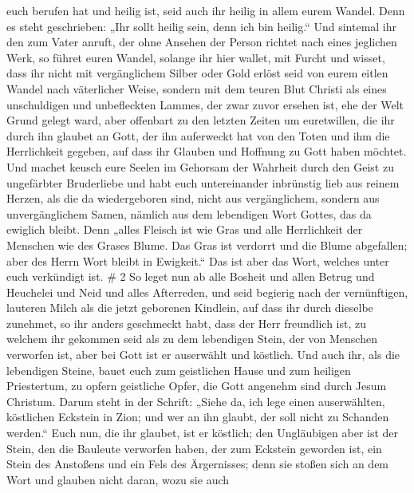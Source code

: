 euch berufen hat und heilig ist, seid auch ihr heilig in allem eurem
Wandel.  Denn es steht geschrieben: „Ihr sollt heilig sein,
denn ich bin heilig.``  Und sintemal ihr den zum Vater
anruft, der ohne Ansehen der Person richtet nach eines jeglichen Werk,
so führet euren Wandel, solange ihr hier wallet, mit Furcht
 und wisset, dass ihr nicht mit vergänglichem Silber oder
Gold erlöst seid von eurem eitlen Wandel nach väterlicher Weise,
 sondern mit dem teuren Blut Christi als eines unschuldigen
und unbefleckten Lammes,  der zwar zuvor ersehen ist, ehe
der Welt Grund gelegt ward, aber offenbart zu den letzten Zeiten um
euretwillen,  die ihr durch ihn glaubet an Gott, der ihn
auferweckt hat von den Toten und ihm die Herrlichkeit gegeben, auf dass
ihr Glauben und Hoffnung zu Gott haben möchtet.  Und machet
keusch eure Seelen im Gehorsam der Wahrheit durch den Geist zu
ungefärbter Bruderliebe und habt euch untereinander inbrünstig lieb aus
reinem Herzen,  als die da wiedergeboren sind, nicht aus
vergänglichem, sondern aus unvergänglichem Samen, nämlich aus dem
lebendigen Wort Gottes, das da ewiglich bleibt.  Denn
„alles Fleisch ist wie Gras und alle Herrlichkeit der Menschen wie des
Grases Blume. Das Gras ist verdorrt und die Blume abgefallen;
 aber des Herrn Wort bleibt in Ewigkeit.`` Das ist aber das
Wort, welches unter euch verkündigt ist. \# 2  So leget nun
ab alle Bosheit und allen Betrug und Heuchelei und Neid und alles
Afterreden,  und seid begierig nach der vernünftigen,
lauteren Milch als die jetzt geborenen Kindlein, auf dass ihr durch
dieselbe zunehmet,  so ihr anders geschmeckt habt, dass der
Herr freundlich ist,  zu welchem ihr gekommen seid als zu
dem lebendigen Stein, der von Menschen verworfen ist, aber bei Gott ist
er auserwählt und köstlich.  Und auch ihr, als die
lebendigen Steine, bauet euch zum geistlichen Hause und zum heiligen
Priestertum, zu opfern geistliche Opfer, die Gott angenehm sind durch
Jesum Christum.  Darum steht in der Schrift: „Siehe da, ich
lege einen auserwählten, köstlichen Eckstein in Zion; und wer an ihn
glaubt, der soll nicht zu Schanden werden.``  Euch nun, die
ihr glaubet, ist er köstlich; den Ungläubigen aber ist der Stein, den
die Bauleute verworfen haben, der zum Eckstein geworden ist,
 ein Stein des Anstoßens und ein Fels des Ärgernisses; denn
sie stoßen sich an dem Wort und glauben nicht daran, wozu sie auch
